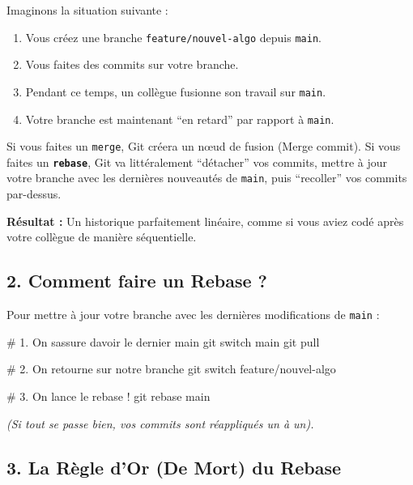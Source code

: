 \documentclass[
  letterpaper,
  DIV=11,
  numbers=noendperiod]{scrreprt}
\newenvironment{Shaded}{\begin{snugshade}}{\end{snugshade}}
\newcommand{\CommentTok}[1]{\textcolor[rgb]{0.37,0.37,0.37}{#1}}
\newcommand{\FunctionTok}[1]{\textcolor[rgb]{0.28,0.35,0.67}{#1}}
\newcommand{\NormalTok}[1]{\textcolor[rgb]{0.00,0.23,0.31}{#1}}
\begin{document}
Imaginons la situation suivante :

\begin{enumerate}
\def\labelenumi{\arabic{enumi}.}
\item
  Vous créez une branche \texttt{feature/nouvel-algo} depuis
  \texttt{main}.
\item
  Vous faites des commits sur votre branche.
\item
  Pendant ce temps, un collègue fusionne son travail sur \texttt{main}.
\item
  Votre branche est maintenant ``en retard'' par rapport à
  \texttt{main}.
\end{enumerate}

Si vous faites un \texttt{merge}, Git créera un nœud de fusion (Merge
commit). Si vous faites un \textbf{\texttt{rebase}}, Git va
littéralement ``détacher'' vos commits, mettre à jour votre branche avec
les dernières nouveautés de \texttt{main}, puis ``recoller'' vos commits
par-dessus.

\textbf{Résultat :} Un historique parfaitement linéaire, comme si vous
aviez codé après votre collègue de manière séquentielle.

\subsection{2. Comment faire un Rebase ?}\label{comment-faire-un-rebase}

Pour mettre à jour votre branche avec les dernières modifications de
\texttt{main} :

\begin{Shaded}
\begin{Highlighting}[]
\CommentTok{\# 1. On s\textquotesingle{}assure d\textquotesingle{}avoir le dernier main}
\FunctionTok{git}\NormalTok{ switch main}
\FunctionTok{git}\NormalTok{ pull}

\CommentTok{\# 2. On retourne sur notre branche}
\FunctionTok{git}\NormalTok{ switch feature/nouvel{-}algo}

\CommentTok{\# 3. On lance le rebase !}
\FunctionTok{git}\NormalTok{ rebase main}
\end{Highlighting}
\end{Shaded}

\emph{(Si tout se passe bien, vos commits sont réappliqués un à un).}

\subsection{3. La Règle d'Or (De Mort) du
Rebase}\label{la-ruxe8gle-dor-de-mort-du-rebase}
\end{document}
